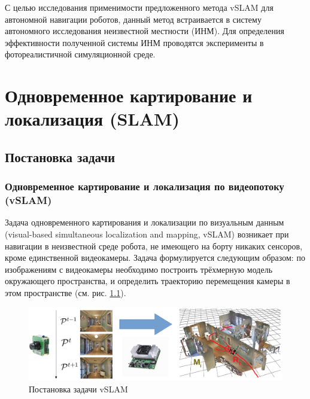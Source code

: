 \documentclass{mipt-thesis-ms}
\begin{document}
	С целью исследования применимости предложенного метода vSLAM для автономной навигации роботов, данный метод встраивается в систему автономного исследования неизвестной местности (ИНМ). Для определения эффективности полученной системы ИНМ проводятся эксперименты в фотореалистичной симуляционной среде.
	
	
	\chapter{Одновременное картирование и локализация (SLAM)}
	
	\section{Постановка задачи}
	
	\subsection{Одновременное картирование и локализация по видеопотоку (vSLAM)}
	
	Задача одновременного картирования и локализации по визуальным данным (visual-based simultaneous localization and mapping, vSLAM) возникает при навигации в неизвестной среде робота, не имеющего на борту никаких сенсоров, кроме единственной видеокамеры. Задача формулируется следующим образом: по изображениям с видеокамеры необходимо построить трёхмерную модель окружающего пространства, и определить траекторию перемещения камеры в этом пространстве (см. рис. \ref{figure_vslam_setting}).
	
	\begin{figure}
		\includegraphics[width=1.0\textwidth]{img/vslam_problem_setting_1.png}
		\caption{Постановка задачи vSLAM}
		\label{figure_vslam_setting}
	\end{figure}
	
\end{document}
